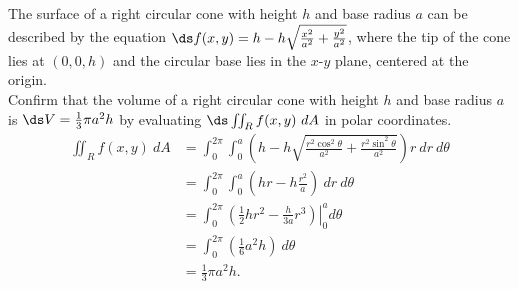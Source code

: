 {The surface of a right circular cone with height $h$ and base radius $a$ can be described by the equation $\ds f(x,y) = h-h\sqrt{\frac{x^2}{a^2}+\frac{y^2}{a^2}}$, where the tip of the cone lies at $(0,0,h)$ and the circular base lies in the $x$-$y$ plane, centered at the origin.\\

Confirm that the volume of a right circular cone with height $h$ and base radius $a$ is $\ds V = \frac13\pi a^2h$ by evaluating $\ds \iint_R f(x,y)\ dA$ in polar coordinates.
}
{\begin{align*}
\iint_R f(x,y)\ dA &= \int_0^{2\pi}\int_0^a \left(h-h\sqrt{\frac{r^2\cos^2\theta}{a^2}+\frac{r^2\sin^2\theta}{a^2}}\right)r\ dr\ d\theta \\
			&= \int_0^{2\pi}\int_0^a \left(hr-h\frac{r^2}{a}\right)\ dr\ d\theta \\
			&= \int_0^{2\pi}\left.\left(\frac12hr^2-\frac{h}{3a}r^3\right)\right|_0^a d\theta \\
			&= \int_0^{2\pi} \left(\frac16a^2h\right)\ d\theta\\
			&= \frac13\pi a^2h.
\end{align*}
}